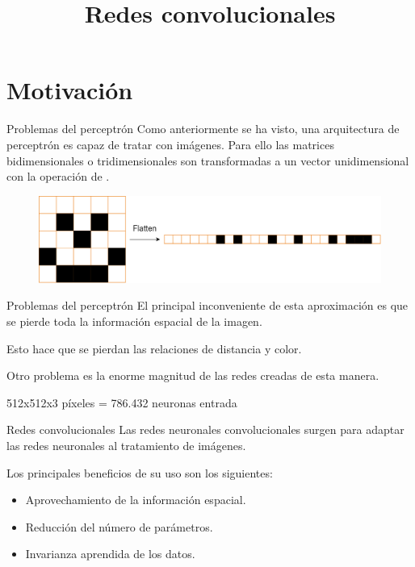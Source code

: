 



\title{Redes convolucionales}


\maketitle

\section{Motivación}

\begin{frame}{Problemas del perceptrón}
Como anteriormente se ha visto, una arquitectura de \alert{perceptrón} es capaz de tratar con imágenes. Para ello las matrices \alert{bidimensionales} o \alert{tridimensionales} son transformadas a un vector \alert{unidimensional} con la operación de .

\begin{figure}
    \centering
    \includegraphics[width=\textwidth]{Slides/figures/Tema 3/Flatten.png}
\end{figure}
\end{frame}

\begin{frame}{Problemas del perceptrón}
El principal \alert{inconveniente} de esta aproximación es que se pierde toda la información \alert{espacial} de la imagen.

Esto hace que se pierdan las \alert{relaciones} de \alert{distancia} y \alert{color}.

Otro problema es la \alert{enorme} magnitud de las redes creadas de esta manera.

\centering
{\Large 512x512x3 píxeles = 786.432 neuronas entrada}
\end{frame}

\begin{frame}{Redes convolucionales}
Las redes neuronales \alert{convolucionales} surgen para adaptar las redes neuronales al \alert{tratamiento de imágenes}.

Los principales beneficios de su uso son los siguientes:
\begin{itemize}
    \item Aprovechamiento de la información \alert{espacial}.
    \item Reducción del número de \alert{parámetros}.
    \item \alert{Invarianza} aprendida de los datos.
\end{itemize}
\end{frame}

